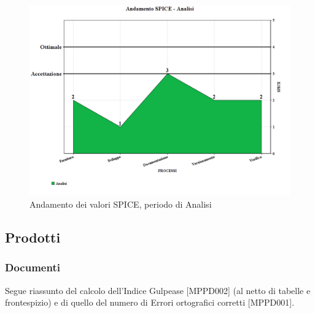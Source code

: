 \documentclass[openany,12pt,a4paper]{report}
\begin{document}
\begin{figure}[H]
	\includegraphics[scale=0.5]{verifica-analisi-spice}
	\centering
	\caption{Andamento dei valori SPICE, periodo di Analisi}
\end{figure}

\subsection{Prodotti}

\subsubsection{Documenti}

Segue riassunto del calcolo dell'Indice Gulpease [MPPD002] (al netto di tabelle e frontespizio) e di quello del numero di Errori ortografici corretti [MPPD001].
\end{document}
